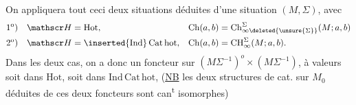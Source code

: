 On appliquera tout ceci   deux situations déduites d'une situation $(M,\Sigma)$, avec
\[
\begin{aligned}
1^{\mathrm o})\quad &\mathscr H=\mathrm{Hot},&
 \mathrm{Ch}(a,b)&=\mathrm{Ch}^{\Sigma}_{\infty\deleted{\unsure{\Sigma}}}(M;a,b)\\
2^{\mathrm o})\quad &\mathscr H=\inserted{\mathrm{Ind}}\,\mathrm{Cat}\,\mathrm{hot},&
 \mathrm{Ch}(a,b)&=\mathrm{CH}^{\Sigma}_{\infty}(M;a,b).
\end{aligned}
\]
Dans les deux cas, on a donc  un foncteur sur $(M\Sigma^{-1})^{o}\times(M\Sigma^{-1})$, à valeurs soit dans $\mathrm{Hot}$, soit dans  $\mathrm{Ind}\,\mathrm{Cat}\,\mathrm{hot}$, (\uline{NB} les deux structures de cat. sur $M_0$ déduites de ces deux foncteurs sont can\textsuperscript{t} isomorphes)

